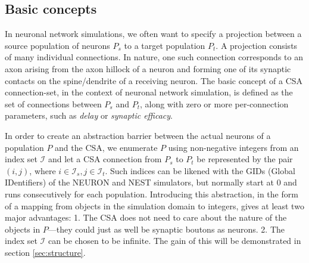 \documentclass{frontiersSCNS} %
\begin{document}
\subsection{Basic concepts}

In neuronal network simulations, we often want to specify a projection
between a source population of neurons $P_s$ to a target population
$P_t$.  A projection consists of many individual connections.  In
nature, one such connection corresponds to an axon arising from the
axon hillock of a neuron and forming one of its synaptic contacts on
the spine/dendrite of a receiving neuron.  The basic concept of a CSA
connection-set, in the context of neuronal network simulation, is
defined as the set of connections between $P_s$ and $P_t$, along with
zero or more per-connection parameters, such as \emph{delay} or
\emph{synaptic efficacy}.

In order to create an abstraction barrier between the actual neurons
of a population $P$ and the CSA, we enumerate $P$ using non-negative
integers from an index set $\mathcal{I}$ and let a CSA connection from
$P_s$ to $P_t$ be represented by the pair $(i, j)$, where $i \in
\mathcal{I}_s, j \in \mathcal{I}_t$.  Such indices can be likened with
the GIDs (Global IDentifiers) of the NEURON and NEST simulators, but
normally start at 0 and runs consecutively for each population.
Introducing this abstraction, in the form of a mapping from objects in
the simulation domain to integers, gives at least two major
advantages: 1. The CSA does not need to care about the nature of the
objects in $P$---they could just as well be synaptic boutons as neurons.
2. The index set $\mathcal{I}$ can be chosen to be infinite.  The
gain of this will be demonstrated in section \ref{sec:structure}.
\end{document}
